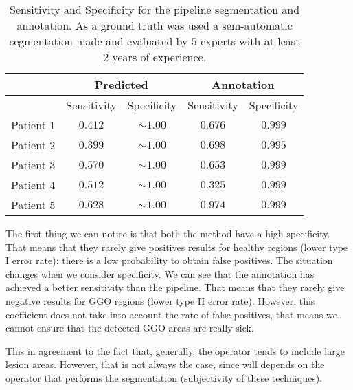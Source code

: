 \documentclass{standalone}
\begin{document}
	\begin{table}[h!]
		\centering
		\begin{tabular}{|c|c|c|c|c|}
			\hline
			\multirow{2}{*}{}		  & \multicolumn{2}{c|}{Predicted} & \multicolumn{2}{c|}{Annotation} \\ \hline
						& Sensitivity & Specificity	 		& Sensitivity & Specificity		 \\ \hline
			Patient 1	& $0.412$	  &	$\sim 1.00$			&	$0.676$	  &	$ 0.999$ 		 \\ 
			Patient 2	& $0.399$	  & $\sim 1.00$ 		&	$0.698$	  & $ 0.995$		 \\
			Patient 3	& $0.570$	  &	$\sim 1.00$			&	$0.653$	  & $ 0.999$		 \\
			Patient 4	& $0.512$	  & $\sim 1.00$			&	$0.325$	  & $ 0.999$		 \\
			Patient 5 	& $0.628$	  & $\sim 1.00$			&	$0.974$	  &	$ 0.999$		 \\ \hline
		\end{tabular}\caption{Sensitivity and Specificity for the pipeline segmentation and annotation. As a ground truth was used a sem-automatic segmentation made and evaluated by $5$ experts with at least $2$ years of experience.}\label{tab:Measures}
		
	\end{table}

 
 
 	The first thing we can notice is that both the method have a high specificity. That means that they rarely give positives results for healthy regions (lower type I error rate): there is a low probability to obtain false positives. 
 	The situation changes when we consider specificity. We can see that the annotation has achieved a better sensitivity than the pipeline. That means that they rarely give negative results for GGO regions (lower type II error rate). However, this coefficient does not take into account the rate of false positives, that means we cannot ensure that the detected GGO areas are really sick.
 
	 This in agreement to the fact that, generally, the operator tends to include large lesion areas. However, that is not always the case, since will depends on the operator that performs the segmentation (subjectivity of these techniques).
 
\end{document}
